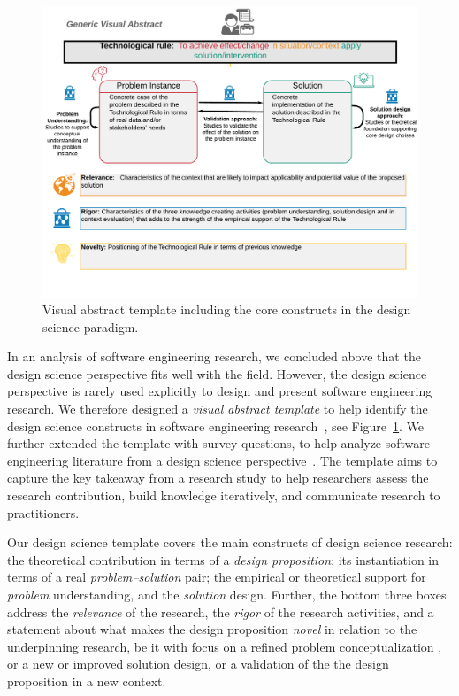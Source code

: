 \documentclass[graybox]{svmult}
\begin{document}
\begin{figure}[t]
  \includegraphics[width=1.0\textwidth]{Figures/GenericVA.png}
\caption{Visual abstract template including the core constructs in the design science paradigm.}
\label{fig:VA-template}       %
\end{figure}


In an analysis of software engineering research, we concluded above that the design science perspective fits well with the field. However, the design science perspective is rarely used explicitly to design and present software engineering research. We therefore designed a \emph{visual abstract template} to help identify the design science constructs in software engineering research~\cite{StoreyESEM17}, see Figure~\ref{fig:VA-template}. We further extended the template with survey questions, to help analyze software engineering literature from a design science perspective~\cite{Engstrom19arxiv}. The template aims to capture the key takeaway from a research study to help researchers assess the research contribution, build knowledge iteratively, and communicate research to practitioners. %

Our design science template covers the main constructs of design science research: the theoretical contribution in terms of a \emph{design proposition}; its instantiation in terms of a real \emph{problem--solution} pair;  the empirical or theoretical support for \emph{problem} understanding, and the \emph{solution} design. Further, the bottom three boxes address the \emph{relevance} of the research, the \emph{rigor} of the research activities,  and a statement about what makes the design proposition \emph{novel} in relation to the underpinning research, be it with focus on a refined problem conceptualization , or a new or improved solution design, or a validation of the the design proposition in a new context. 
\end{document}
